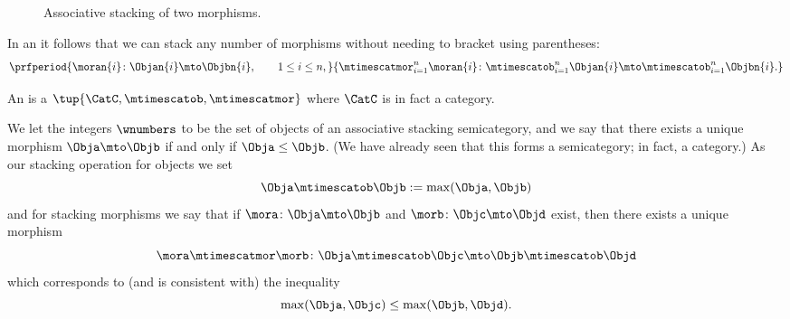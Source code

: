 \begin{figure}[h!]
    \centering
    \caption{Associative stacking of two morphisms.}
    \label{fig:double-stacked-new}
\end{figure}

\begin{remark}
    In an   it follows that we can stack any number of morphisms without needing to bracket using parentheses:
    \begin{equation}
        \prfperiod{
            \moran{i} \colon \Objan{i} \mto \Objbn{i}, \qquad 1 \leq i \leq n,
        }{
            \mtimescatmor_{i=1}^n \moran{i} \colon \mtimescatob_{i=1}^n \Objan{i} \mto \mtimescatob_{i=1}^n \Objbn{i}.
        }
    \end{equation}
\end{remark}

\begin{ctdefinition}
    \label{def:assoc-stacking-cat}
    An  is a  $\tup{\CatC, \mtimescatob, \mtimescatmor}$ where $\CatC$ is in fact a category.
     \end{ctdefinition}
     
\begin{example}\label{ex:assoc-stacking-semicat-integers-max}
We let the integers $\wnumbers$ to be the set of objects of an associative stacking semicategory, and we say that there exists a unique morphism $\Obja \mto \Objb$ if and only if $\Obja \leq \Objb$. (We have already seen that this forms a semicategory; in fact, a category.) As our stacking operation for objects we set
\begin{equation}
\Obja \mtimescatob \Objb := \max(\Obja, \Objb)
\end{equation}
and for stacking morphisms we say that if $\mora \colon \Obja \mto \Objb$ and $\morb \colon \Objc \mto \Objd$ exist, then there exists a unique morphism
\begin{equation}
\mora \mtimescatmor \morb \colon \Obja \mtimescatob \Objc \mto \Objb \mtimescatob \Objd
\end{equation}
which corresponds to (and is consistent with) the inequality 
\begin{equation}
\max(\Obja, \Objc) \leq \max(\Objb, \Objd).
\end{equation}
\end{example}

